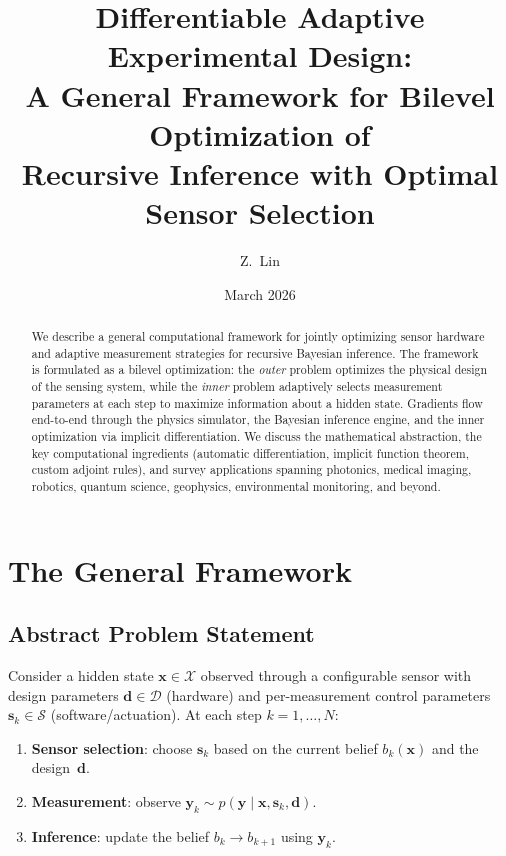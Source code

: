 \documentclass[11pt,a4paper]{article}
\title{Differentiable Adaptive Experimental Design:\\A General Framework for Bilevel Optimization of\\Recursive Inference with Optimal Sensor Selection}
\author{Z.\ Lin}
\date{March 2026}
\begin{document}
\maketitle

\begin{abstract}
We describe a general computational framework for jointly optimizing sensor hardware and adaptive measurement strategies for recursive Bayesian inference.  The framework is formulated as a bilevel optimization: the \emph{outer} problem optimizes the physical design of the sensing system, while the \emph{inner} problem adaptively selects measurement parameters at each step to maximize information about a hidden state.  Gradients flow end-to-end through the physics simulator, the Bayesian inference engine, and the inner optimization via implicit differentiation.  We discuss the mathematical abstraction, the key computational ingredients (automatic differentiation, implicit function theorem, custom adjoint rules), and survey applications spanning photonics, medical imaging, robotics, quantum science, geophysics, environmental monitoring, and beyond.
\end{abstract}

\tableofcontents
\newpage

\section{The General Framework}

\subsection{Abstract Problem Statement}

Consider a hidden state $\bm{x} \in \mathcal{X}$ observed through a configurable sensor with design parameters $\bm{d} \in \mathcal{D}$ (hardware) and per-measurement control parameters $\bm{s}_k \in \mathcal{S}$ (software/actuation).  At each step $k = 1, \ldots, N$:

\begin{enumerate}[nosep]
  \item \textbf{Sensor selection}: choose $\bm{s}_k$ based on the current belief $b_k(\bm{x})$ and the design~$\bm{d}$.
  \item \textbf{Measurement}: observe $\bm{y}_k \sim p(\bm{y} \mid \bm{x}, \bm{s}_k, \bm{d})$.
  \item \textbf{Inference}: update the belief $b_k \to b_{k+1}$ using $\bm{y}_k$.
\end{enumerate}
\end{document}
